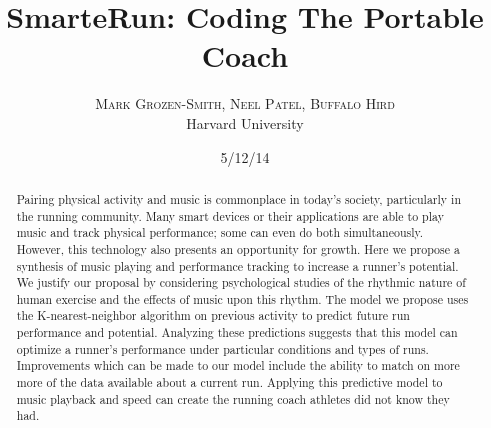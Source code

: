 \documentclass[twoside]{article}
\title{\vspace{-15mm}\fontsize{24pt}{10pt}\selectfont\textbf{SmarteRun: Coding The Portable Coach}} %
\author{
\large
\textsc{Mark Grozen-Smith, Neel Patel, Buffalo Hird}\\[2mm] %
\normalsize Harvard University \\ %
\vspace{-5mm}
}
\date{5/12/14}
\begin{document}
\maketitle %

\thispagestyle{fancy} %


\begin{abstract}

\noindent Pairing physical activity and music is commonplace in today's society, particularly in the running community.  Many smart devices or their applications are able to play music and track physical performance; some can even do both simultaneously. However, this technology also presents an opportunity for growth. Here we propose a synthesis of music playing and performance tracking to increase a runner's potential. We justify our proposal by considering psychological studies of the rhythmic nature of human exercise and the effects of music upon this rhythm. The model we propose uses the K-nearest-neighbor algorithm on previous activity to predict future run performance and potential. Analyzing these predictions suggests that this model can optimize a runner's performance under particular conditions and types of runs. Improvements which can be made to our model include the ability to match on more more of the data available about a current run. Applying this predictive model to music playback and speed can create the running coach athletes did not know they had.

\end{abstract}

\end{document}
